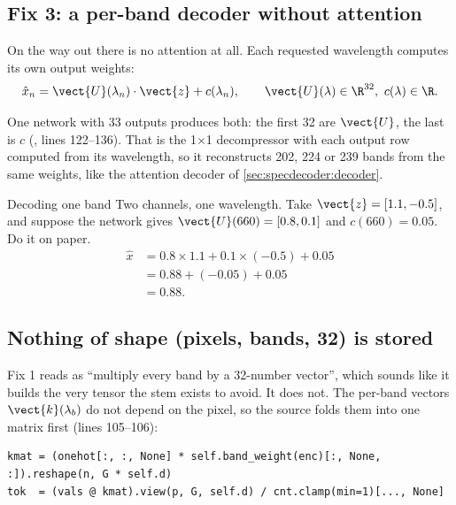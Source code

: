 \subsection{Fix 3: a per-band decoder without attention}

On the way out there is no attention at all. Each requested wavelength computes its own output weights:
\begin{equation}\label{eq:specdecoder:fix3}
  \hat{x}_n = \vect{U}(\lambda_n)\cdot\vect{z} + c(\lambda_n),\qquad \vect{U}(\lambda)\in\R^{32},\ c(\lambda)\in\R .
\end{equation}
{\sloppy One  network with 33 outputs produces both: the first 32 are $\vect{U}$, the last is $c$ (, lines 122--136). That is the 1$\times$1 decompressor with each output row computed from its wavelength, so it reconstructs 202, 224 or 239 bands from the same weights, like the attention decoder of \cref{sec:specdecoder:decoder}.\par}

\begin{worked}[label={we:specdecoder:fix3}]{Decoding one band}
Two channels, one wavelength. Take $\vect{z} = [1.1, -0.5]$, and suppose the network gives $\vect{U}(660) = [0.8, 0.1]$ and $c(660) = 0.05$. Do it on paper.
\begin{align*}
  \hat{x} &= 0.8\times1.1 + 0.1\times(-0.5) + 0.05\\
  &= 0.88 + (-0.05) + 0.05\\
  &= 0.88 .
\end{align*}
\end{worked}


\subsection{Nothing of shape (pixels, bands, 32) is stored}

Fix 1 reads as ``multiply every band by a 32-number vector'', which sounds like it builds the very  tensor the stem exists to avoid. It does not. The per-band vectors $\vect{k}(\lambda_b)$ do not depend on the pixel, so the source folds them into one matrix first (lines 105--106):
\begin{lstlisting}
kmat = (onehot[:, :, None] * self.band_weight(enc)[:, None, :]).reshape(n, G * self.d)
tok  = (vals @ kmat).view(p, G, self.d) / cnt.clamp(min=1)[..., None]
\end{lstlisting}

